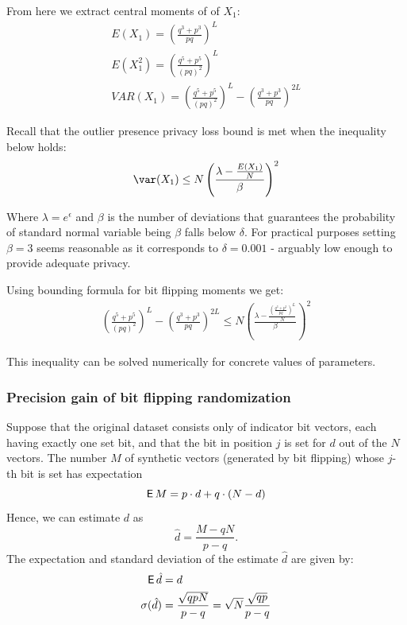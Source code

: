 \documentclass[11pt]{article}
\begin{document}
 From here we extract central moments of of $X_1$:
  \begin{align*}
 E(X_1) =  \left ( \frac{q^3 + p^3}{ pq } \right )^L \\
 E(X_1^2) =  \left ( \frac{q^5 + p^5}{ (pq)^2 } \right )^L \\
VAR(X_1) =  \left ( \frac{q^5 + p^5}{ (pq)^2 } \right )^L - \left ( \frac{q^3 + p^3}{ pq } \right )^{2L}
\end{align*}

Recall that the outlier presence privacy loss bound is met when the inequality below holds:
\begin{align}
\var(X_1) \le N \left ( \frac{\lambda - \frac{E(X_1)}{N}}{\beta} \right )^2
\end{align}

Where $\lambda = e^{\epsilon}$ and $\beta$ is the number of deviations that guarantees the probability of standard normal variable being $\beta$ falls below $\delta$.  For practical purposes setting $\beta=3$ seems reasonable as it corresponds to $\delta=0.001$ - arguably low enough to provide adequate privacy.

Using bounding formula for bit flipping moments we get:
\begin{align}
 \left ( \frac{q^5 + p^5}{ (pq)^2 } \right )^L - \left ( \frac{q^3 + p^3}{ pq } \right )^{2L} \le N \left ( \frac{\lambda - \frac{  \left ( \frac{q^3 + p^3}{ pq } \right )^L }{N}}{\beta} \right )^2
\end{align}

This inequality can be solved numerically for concrete values of parameters.

\subsubsection{Precision gain of bit flipping randomization}

Suppose that the original dataset consists only of indicator bit vectors, each having exactly one set bit, and that the bit in position $j$ is set for $d$ out of the $N$ vectors.
The number $M$ of synthetic vectors (generated by bit flipping) whose $j$-th bit is set has expectation
\[ \operatorname{\mathsf{E}} M = p \cdot d + q \cdot (N-d) \]
Hence, we can estimate $d$ as
\[ \hat{d} = \frac{M-qN}{p-q}. \]
The expectation and standard deviation of the estimate $\hat{d}$ are given by:
\begin{align*}
\operatorname{\mathsf{E}} \hat{d} &= d \\
\sigma( \hat{d}) &= \frac{\sqrt{qpN}}{p-q} = \sqrt{N} \frac{\sqrt{qp}}{p-q}
\end{align*}
\end{document}
